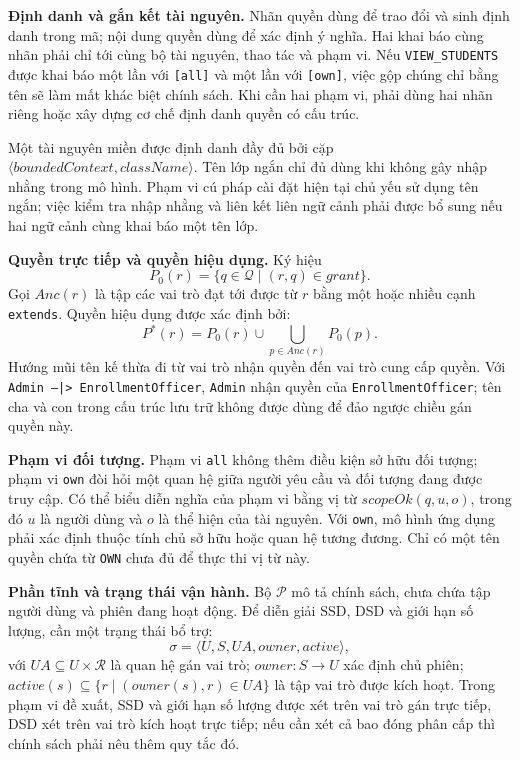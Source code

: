 \textbf{Định danh và gắn kết tài nguyên.} Nhãn quyền dùng để trao đổi và sinh định danh trong mã; nội dung quyền dùng để xác định ý nghĩa. Hai khai báo cùng nhãn phải chỉ tới cùng bộ tài nguyên, thao tác và phạm vi. Nếu \texttt{VIEW\_STUDENTS} được khai báo một lần với \texttt{[all]} và một lần với \texttt{[own]}, việc gộp chúng chỉ bằng tên sẽ làm mất khác biệt chính sách. Khi cần hai phạm vi, phải dùng hai nhãn riêng hoặc xây dựng cơ chế định danh quyền có cấu trúc.

Một tài nguyên miền được định danh đầy đủ bởi cặp $\langle\mathit{boundedContext},\mathit{className}\rangle$. Tên lớp ngắn chỉ đủ dùng khi không gây nhập nhằng trong mô hình. Phạm vi cú pháp cài đặt hiện tại chủ yếu sử dụng tên ngắn; việc kiểm tra nhập nhằng và liên kết liên ngữ cảnh phải được bổ sung nếu hai ngữ cảnh cùng khai báo một tên lớp.

\textbf{Quyền trực tiếp và quyền hiệu dụng.} Ký hiệu
\[
P_0(r)=\{q\in\mathcal{Q}\mid(r,q)\in\mathit{grant}\}.
\]
Gọi $\mathit{Anc}(r)$ là tập các vai trò đạt tới được từ $r$ bằng một hoặc nhiều cạnh \texttt{extends}. Quyền hiệu dụng được xác định bởi:
\[
P^{*}(r)=P_0(r)\cup\bigcup_{p\in\mathit{Anc}(r)}P_0(p).
\]
Hướng mũi tên kế thừa đi từ vai trò nhận quyền đến vai trò cung cấp quyền. Với \texttt{Admin --|> EnrollmentOfficer}, \texttt{Admin} nhận quyền của \texttt{EnrollmentOfficer}; tên cha và con trong cấu trúc lưu trữ không được dùng để đảo ngược chiều gán quyền này.

\textbf{Phạm vi đối tượng.} Phạm vi \texttt{all} không thêm điều kiện sở hữu đối tượng; phạm vi \texttt{own} đòi hỏi một quan hệ giữa người yêu cầu và đối tượng đang được truy cập. Có thể biểu diễn nghĩa của phạm vi bằng vị từ $\mathit{scopeOk}(q,u,o)$, trong đó $u$ là người dùng và $o$ là thể hiện của tài nguyên. Với \texttt{own}, mô hình ứng dụng phải xác định thuộc tính chủ sở hữu hoặc quan hệ tương đương. Chỉ có một tên quyền chứa từ \texttt{OWN} chưa đủ để thực thi vị từ này.

\textbf{Phần tĩnh và trạng thái vận hành.} Bộ $\mathcal{P}$ mô tả chính sách, chưa chứa tập người dùng và phiên đang hoạt động. Để diễn giải SSD, DSD và giới hạn số lượng, cần một trạng thái bổ trợ:
\[
\sigma=\langle U,S,UA,\mathit{owner},\mathit{active}\rangle,
\]
với $UA\subseteq U\times\mathcal{R}$ là quan hệ gán vai trò; $\mathit{owner}:S\to U$ xác định chủ phiên; $\mathit{active}(s)\subseteq\{r\mid(\mathit{owner}(s),r)\in UA\}$ là tập vai trò được kích hoạt. Trong phạm vi đề xuất, SSD và giới hạn số lượng được xét trên vai trò gán trực tiếp, DSD xét trên vai trò kích hoạt trực tiếp; nếu cần xét cả bao đóng phân cấp thì chính sách phải nêu thêm quy tắc đó.

